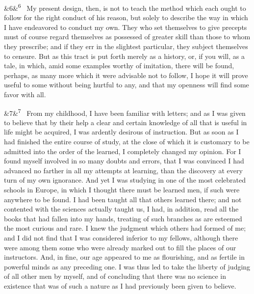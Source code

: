 \documentclass[12pt]{article}
\newcommand{\para}[1][]{\par\noindent\ifx&#1&\else\textsuperscript{\footnotesize #1}~\fi}
\begin{document}
\para[6] My present design, then, is not to teach the method which each ought to follow for the right conduct of his reason, but solely to describe the way in which I have endeavored to conduct my own. They who set themselves to give precepts must of course regard themselves as possessed of greater skill than those to whom they prescribe; and if they err in the slightest particular, they subject themselves to censure. But as this tract is put forth merely as a history, or, if you will, as a tale, in which, amid some examples worthy of imitation, there will be found, perhaps, as many more which it were advisable not to follow, I hope it will prove useful to some without being hurtful to any, and that my openness will find some favor with all.

\para[7] From my childhood, I have been familiar with letters; and as I was given to believe that by their help a clear and certain knowledge of all that is useful in life might be acquired, I was ardently desirous of instruction. But as soon as I had finished the entire course of study, at the close of which it is customary to be admitted into the order of the learned, I completely changed my opinion. For I found myself involved in so many doubts and errors, that I was convinced I had advanced no farther in all my attempts at learning, than the discovery at every turn of my own ignorance. And yet I was studying in one of the most celebrated schools in Europe, in which I thought there must be learned men, if such were anywhere to be found. I had been taught all that others learned there; and not contented with the sciences actually taught us, I had, in addition, read all the books that had fallen into my hands, treating of such branches as are esteemed the most curious and rare. I knew the judgment which others had formed of me; and I did not find that I was considered inferior to my fellows, although there were among them some who were already marked out to fill the places of our instructors. And, in fine, our age appeared to me as flourishing, and as fertile in powerful minds as any preceding one. I was thus led to take the liberty of judging of all other men by myself, and of concluding that there was no science in existence that was of such a nature as I had previously been given to believe.
\end{document}
